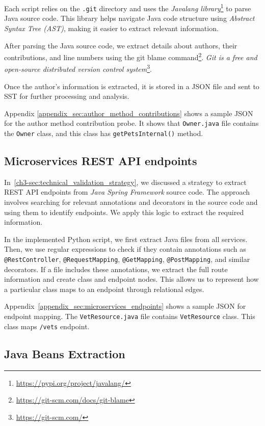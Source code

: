 Each script relies on the \texttt{.git} directory and uses the \textit{Javalang library}\footnote{\url{https://pypi.org/project/javalang/}} to parse Java source code. This library helps navigate Java code structure using \textit{Abstract Syntax Tree (AST)}, making it easier to extract relevant information.

After parsing the Java source code, we extract details about authors, their contributions, and line numbers using the git blame command\footnote{\url{https://git-scm.com/docs/git-blame}}. \textit{Git is a free and open-source distributed version control system}\footnote{\url{https://git-scm.com/}}.

Once the author's information is extracted, it is stored in a JSON file and sent to SST for further processing and analysis.

\sloppy
Appendix \ref{appendix_sec:author_method_contributions} shows a sample JSON for the author method contribution probe. It shows that \texttt{Owner.java} file contains the \texttt{Owner} class, and this class has \texttt{getPetsInternal()} method.

\subsection{Microservices REST API endpoints}

In~\autoref{ch3-sec:technical_validation_strategy}, we discussed a strategy to extract REST API endpoints from \textit{Java Spring Framework} source code. The approach involves searching for relevant annotations and decorators in the source code and using them to identify endpoints. We apply this logic to extract the required information.  

In the implemented Python script, we first extract Java files from all services. Then, we use regular expressions to check if they contain annotations such as \texttt{@RestController}, \texttt{@RequestMapping}, \texttt{@GetMapping}, \texttt{@PostMapping}, and similar decorators. If a file includes these annotations, we extract the full route information and create class and endpoint nodes. This allows us to represent how a particular class maps to an endpoint through relational edges.

Appendix~\ref{appendix_sec:microservices_endpoints} shows a sample JSON for endpoint mapping. The \texttt{VetResource.java} file contains \texttt{VetResource} class. This class maps \texttt{/vets} endpoint.

\subsection{Java Beans Extraction}


